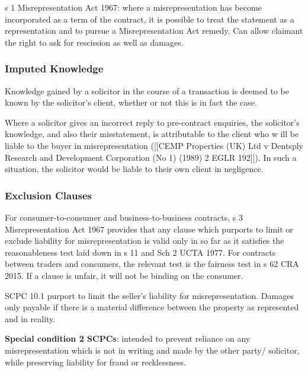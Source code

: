 \documentclass[
]{article}
\newenvironment{Shaded}{}{}
\newcommand{\NormalTok}[1]{#1}
\begin{document}
s 1 Misrepresentation Act 1967: where a misrepresentation has become
incorporated as a term of the contract, it is possible to treat the
statement as a representation and to pursue a Misrepresentation Act
remedy. Can allow claimant the right to ask for rescission as well as
damages.

\hypertarget{imputed-knowledge}{%
\subsubsection{Imputed Knowledge}\label{imputed-knowledge}}

Knowledge gained by a solicitor in the course of a transaction is deemed
to be known by the solicitor's client, whether or not this is in fact
the case.

\begin{Shaded}
\begin{Highlighting}[]
\NormalTok{Where a solicitor gives an incorrect reply to pre{-}contract enquiries, the solicitor’s knowledge, and also their misstatement, is attributable to the client who w ill be liable to the buyer in misrepresentation ([[CEMP Properties (UK) Ltd v Dentsply Research and Development Corporation (No 1) (1989) 2 EGLR 192]]). In such a situation, the solicitor would be liable to their own client in negligence.}
\end{Highlighting}
\end{Shaded}

\hypertarget{exclusion-clauses-1}{%
\subsubsection{Exclusion Clauses}\label{exclusion-clauses-1}}

For consumer-to-consumer and business-to-business contracts, s 3
Misrepresentation Act 1967 provides that any clause which purports to
limit or exclude liability for misrepresentation is valid only in so far
as it satisfies the reasonableness test laid down in s 11 and Sch 2 UCTA
1977. For contracts between traders and consumers, the relevant test is
the fairness test in s 62 CRA 2015. If a clause is unfair, it will not
be binding on the consumer.

SCPC 10.1 purport to limit the seller's liability for misrepresentation.
Damages only payable if there is a material difference between the
property as represented and in reality.

\textbf{Special condition 2 SCPCs}: intended to prevent reliance on any
misrepresentation which is not in writing and made by the other party/
solicitor, while preserving liability for fraud or recklessness.
\end{document}
